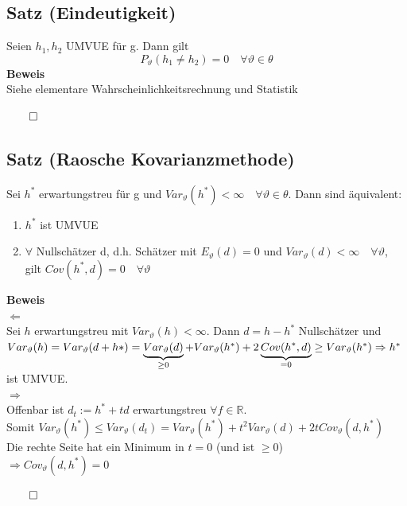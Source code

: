 \documentclass[german,10pt,oneside, fleqn, a4paper]{article}
\newcommand {\R}	{\mathbb{R}}
\newcommand{\Ra}	{\Rightarrow}
\newcommand{\La}	{\Leftarrow}
\newcommand{\QED}{\begin{flushright}$\qed$\end{flushright}}
\newcommand{\beweis}{\textbf{Beweis}\\}
\newcommand{\1}[1]{1_{#1}}
\newcommand{\2}[1]{\1{\brac{#1}}}
\begin{document}
\subsection{Satz (Eindeutigkeit)}
\label{11.3}
Seien $h_1,h_2$ UMVUE für g. Dann gilt \[
P_\vartheta(h_1\neq h_2)=0\quad\forall\vartheta\in\theta\]
\beweis Siehe elementare Wahrscheinlichkeitsrechnung und Statistik\QED

\subsection{Satz (Raosche Kovarianzmethode)}
\label{11.4}
Sei $h^*$ erwartungstreu für g und $Var_\vartheta(h^*)<\infty\quad\forall\vartheta\in\theta$. Dann sind äquivalent:\begin{enumerate}[label=(\alph*)]
\item $h^*$ ist UMVUE
\item $\forall$ Nullschätzer d, d.h. Schätzer mit $E_\vartheta(d)=0$ und $Var_\vartheta(d)<\infty\quad\forall\vartheta$, gilt $Cov(h^*,d)=0\quad\forall\vartheta$
\end{enumerate}
\beweis
\glqq $\La$\grqq\\
Sei $h$ erwartungstreu mit $Var_\vartheta(h)<\infty$. Dann $d=h-h^*$ Nullschätzer und\\
$Var_\vartheta(h)=Var_\vartheta(d+h*)=\underbrace{Var_\vartheta(d)}_{\geq0}+Var_\vartheta(h^*)+2\underbrace{Cov(h^*,d)}_{=0}\geq Var_\vartheta(h^*)\\
\Ra h^*$ ist UMVUE.\\
\glqq $\Ra$ \grqq\\
Offenbar ist $d_t:=h^*+td$ erwartungstreu $\forall f\in\R$. \\
Somit $ Var_\vartheta(h^*)\leq Var_\vartheta(d_t)=Var_\vartheta(h^*)+t^2Var_\vartheta(d)+2tCov_\vartheta(d,h^*)$\\
Die rechte Seite hat ein Minimum in $t=0$ (und ist $\geq 0$)\\
$\Ra Cov_\vartheta(d,h^*)=0$\QED
\end{document}
